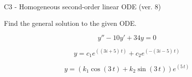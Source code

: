\begin{exercise}
  \begin{exerciseTitle}C3 - Homogeneous second-order linear ODE (ver. 8)\end{exerciseTitle}
  \begin{exerciseStatement}
    
Find the general solution to the given ODE.

    
\[y''-10y'+34y = 0\]

  \end{exerciseStatement}
  \begin{exerciseAnswer}
    
\[y= c_{1} e^{\left(\left(3 i + 5\right) \, t\right)} + c_{2} e^{\left(-\left(3 i - 5\right) \, t\right)}\]

    
\[y= {\left(k_{1} \cos\left(3 \, t\right) + k_{2} \sin\left(3 \, t\right)\right)} e^{\left(5 \, t\right)}\]

  \end{exerciseAnswer}
\end{exercise}